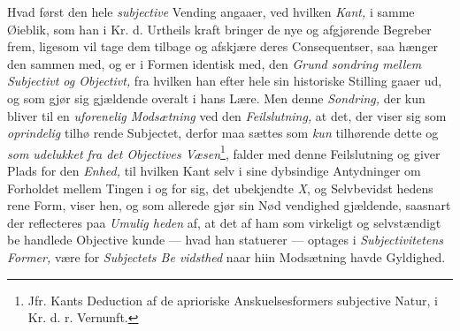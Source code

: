 Hvad først den hele \emph{subjective} Vending angaaer, ved
hvilken \emph{Kant,} i samme Øieblik, som han i Kr. d. Urtheils\-%
kraft bringer de nye og afgjørende Begreber frem, ligesom vil
tage dem tilbage og afskjære deres Consequentser, saa hænger
den sammen med, og er i Formen identisk med, den \emph{Grund\-%
sondring mellem Subjectivt og Objectivt,} fra hvilken
han efter hele sin historiske Stilling gaaer ud, og som gjør
sig gjældende overalt i hans Lære. Men denne \emph{Sondring,}
der kun bliver til en \emph{uforenelig Modsætning} ved den
\emph{Feilslutning,} at det, der viser sig som \emph{oprindelig} tilhø\-%
rende Subjectet, derfor maa sættes som \emph{kun} tilhørende dette
og \emph{som udelukket fra det Objectives Væsen}\footnote{Jfr. Kants Deduction
af de aprioriske Anskuelsesformers subjective
Natur, i Kr. d. r. Vernunft.}, falder
med denne Feilslutning og giver Plads for den \emph{Enhed,} til
hvilken Kant selv i sine dybsindige Antydninger om Forholdet
mellem Tingen i og for sig, det ubekjendte \textit{X}, og Selvbevidst\-%
hedens rene Form, viser hen, og som allerede gjør sin Nød\-%
vendighed gjældende, saasnart der reflecteres paa \emph{Umulig\-%
heden} af, at det af ham som virkeligt og selvstændigt be\-%
handlede Objective kunde --- hvad han statuerer --- optages i
\emph{Subjectivitetens Former,} være for \emph{Subjectets Be\-%
vidsthed} naar hiin Modsætning havde Gyldighed.

